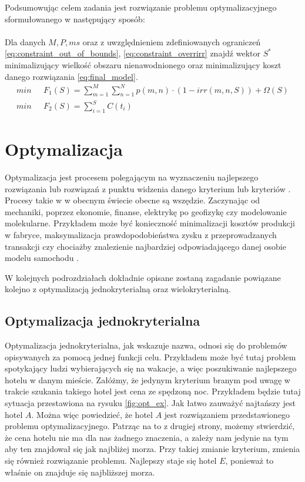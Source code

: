 \documentclass[twoside]{iisthesis}
\begin{document}
Podsumowując celem zadania jest rozwiązanie problemu optymalizacyjnego sformułowanego w następujący sposób:\\\\
Dla danych $M, P, ms$ oraz z uwzględnieniem zdefiniowanych ograniczeń \eqref{eq:constraint_out_of_bounds}, \eqref{eq:constraint_overrirr} znajdź wektor $S^{*}$ minimalizujący wielkość obszaru nienawodnionego oraz minimalizujący koszt danego rozwiązania \eqref{eq:final_model}.
\begin{equation}\label{eq:final_model}
	\begin{split}
		min \text{  }&  F_{1}(S) = \sum_{m=1}^{M}\sum_{n=1}^{N} p(m,n) \cdot (1 - irr(m,n,S)) + \Omega(S)\\
		min \text{  }&	F_{2}(S) = \sum_{i=1}^{S} C(t_{i})
	\end{split}
\end{equation}

\chapter{Optymalizacja}
Optymalizacja jest procesem polegającym na wyznaczeniu najlepszego rozwiązania lub rozwiązań z punktu widzenia danego kryterium lub kryteriów \cite{wiki_optimization}. Procesy takie w w obecnym świecie obecne są wszędzie. Zaczynając od mechaniki, poprzez ekonomie, finanse, elektrykę po geofizykę czy modelowanie molekularne. Przykładem może być konieczność minimalizacji kosztów produkcji w fabryce, maksymalizacja prawdopodobieństwa zysku z przeprowadzanych transakcji czy chociażby znalezienie najbardziej odpowiadającego danej osobie modelu samochodu \cite{wiki_pl_optimization}.

W kolejnych podrozdziałach dokładnie opisane zostaną zagadanie powiązane kolejno z optymalizacją jednokryterialną oraz wielokryterialną.
\section{Optymalizacja jednokryterialna}
Optymalizacja jednokryterialna, jak wskazuje nazwa, odnosi się do problemów opisywanych za pomocą jednej funkcji celu. Przykładem może być tutaj problem spotykający ludzi wybierających się na wakacje, a więc poszukiwanie najlepszego hotelu w danym mieście. Załóżmy, że jedynym kryterium branym pod uwagę w trakcie szukania takiego hotel jest cena ze spędzoną noc. Przykładem będzie tutaj sytuacja przestawiona na rysuku \eqref{fig:opt_ex}. Jak łatwo zauważyć najtańszy jest hotel $A$. Można więc powiedzieć, że hotel $A$ jest rozwiązaniem przedstawionego problemu optymalizacyjnego. Patrząc na to z drugiej strony, możemy stwierdzić, że cena hotelu nie ma dla nas żadnego znaczenia, a zależy nam jedynie na tym aby ten znajdował się jak najbliżej morza. Przy takiej zmianie kryterium, zmienia się również rozwiązanie problemu. Najlepszy staje się hotel $E$, ponieważ to właśnie on znajduje się najbliższej morza.
\end{document}
